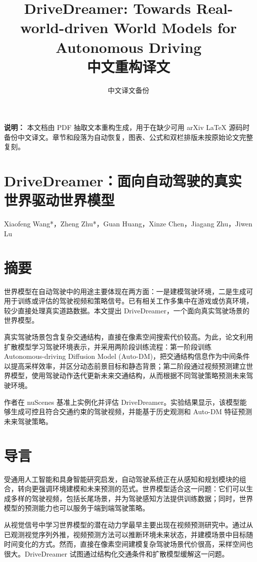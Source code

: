 \documentclass[10pt]{article}
\title{DriveDreamer: Towards Real-world-driven World Models for Autonomous Driving\\[0.5em]\large 中文重构译文}
\author{中文译文备份}
\date{}
\begin{document}
\maketitle

\noindent\textbf{说明：} 本文档由 PDF 抽取文本重构生成，用于在缺少可用 arXiv LaTeX 源码时备份中文译文。章节和段落为自动恢复，图表、公式和双栏排版未按原始论文完整复刻。

\bigskip

\section*{DriveDreamer：面向自动驾驶的真实世界驱动世界模型}

Xiaofeng Wang*，Zheng Zhu*，Guan Huang，Xinze Chen，Jiagang Zhu，Jiwen Lu

\section*{摘要}
世界模型在自动驾驶中的用途主要体现在两方面：一是建模驾驶环境，二是生成可用于训练或评估的驾驶视频和策略信号。已有相关工作多集中在游戏或仿真环境，较少直接处理真实道路数据。本文提出 DriveDreamer，一个面向真实驾驶场景的世界模型。

真实驾驶场景包含复杂交通结构，直接在像素空间搜索代价较高。为此，论文利用扩散模型学习驾驶环境表示，并采用两阶段训练流程：第一阶段训练 Autonomous-driving Diffusion Model (Auto-DM)，把交通结构信息作为中间条件以提高采样效率，并区分动态前景目标和静态背景；第二阶段通过视频预测建立世界模型，使用驾驶动作迭代更新未来交通结构，从而根据不同驾驶策略预测未来驾驶环境。

作者在 nuScenes 基准上实例化并评估 DriveDreamer。实验结果显示，该模型能够生成可控且符合交通约束的驾驶视频，并能基于历史观测和 Auto-DM 特征预测未来驾驶策略。

\section{导言}
受通用人工智能和具身智能研究启发，自动驾驶系统正在从感知和规划模块的组合，转向更强调环境建模和未来预测的范式。世界模型适合这一问题：它们可以生成多样的驾驶视频，包括长尾场景，并为驾驶感知方法提供训练数据；同时，世界模型的预测能力也可以服务于端到端驾驶策略。

从视觉信号中学习世界模型的潜在动力学最早主要出现在视频预测研究中。通过从已观测视觉序列外推，视频预测方法可以推断环境未来状态，并建模场景中目标随时间变化的方式。然而，直接在像素空间建模复杂驾驶场景代价很高，采样空间也很大。DriveDreamer 试图通过结构化交通条件和扩散模型缓解这一问题。
\end{document}
